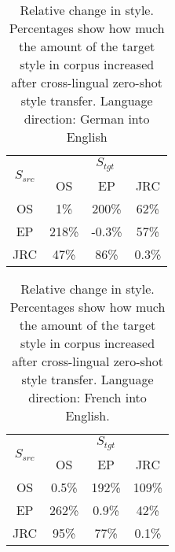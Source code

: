 \documentclass[11pt,a4paper]{article}
\begin{document}
\begin{table}[]
\centering
\begin{tabular}{|c|c|c|c|}
\hline
\multirow{2}{*}{$S_{src}$} & \multicolumn{3}{c|}{$S_{tgt}$}             \\ \cline{2-4} 
                        & OS          & EP          & JRC         \\ \hline
OS                      & 1\% & 200\%  & 62\%   \\ \hline
EP                      & 218\%  & -0.3\% & 57\%   \\ \hline
JRC                     & 47\%   & 86\%  & 0.3\% \\ \hline
\end{tabular}
\caption{\small Relative change in style. Percentages show how much the amount of the target style in corpus increased after cross-lingual zero-shot style transfer. Language direction: German into English}
\label{tab-deencnn-percent}
\end{table}

\begin{table}[]
\centering
\begin{tabular}{|c|c|c|c|}
\hline
\multirow{2}{*}{$S_{src}$} & \multicolumn{3}{c|}{$S_{tgt}$}             \\ \cline{2-4} 
                        & OS          & EP          & JRC         \\ \hline
OS                      & 0.5\% & 192\%  & 109\%   \\ \hline
EP                      & 262\%  & 0.9\% & 42\%   \\ \hline
JRC                     & 95\%   & 77\%  & 0.1\% \\ \hline
\end{tabular}
\caption{\small Relative change in style. Percentages show how much the amount of the target style in corpus increased after cross-lingual zero-shot style transfer. Language direction: French into English.
      }
\label{tab-frencnn-percent}
\end{table}
\end{document}
